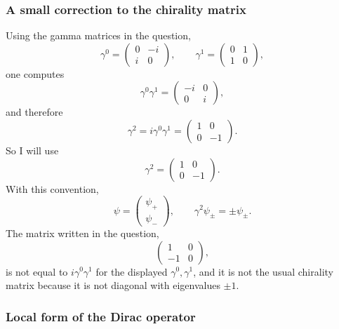 \documentclass[
  10pt,
  a4paper,
  openany]{book}
\begin{document}
\subsubsection{A small correction to the chirality
matrix}\label{a-small-correction-to-the-chirality-matrix}

Using the gamma matrices in the question, \[
\gamma^0=
\begin{pmatrix}
0 & -i\\
i & 0
\end{pmatrix},
\qquad
\gamma^1=
\begin{pmatrix}
0 & 1\\
1 & 0
\end{pmatrix},
\] one computes \[
\gamma^0\gamma^1
=
\begin{pmatrix}
-i & 0\\
0 & i
\end{pmatrix},
\] and therefore \[
\gamma^2=i\gamma^0\gamma^1
=
\begin{pmatrix}
1 & 0\\
0 & -1
\end{pmatrix}.
\] So I will use \[
\gamma^2=
\begin{pmatrix}
1 & 0\\
0 & -1
\end{pmatrix}.
\] With this convention, \[
\psi=
\begin{pmatrix}
\psi_+\\
\psi_-
\end{pmatrix},
\qquad
\gamma^2\psi_\pm=\pm\psi_\pm.
\] The matrix written in the question, \[
\begin{pmatrix}
1 & 0\\
-1 & 0
\end{pmatrix},
\] is not equal to \(i\gamma^0\gamma^1\) for the displayed
\(\gamma^0,\gamma^1\), and it is not the usual chirality matrix because
it is not diagonal with eigenvalues \(\pm 1\).

\subsubsection{Local form of the Dirac
operator}\label{local-form-of-the-dirac-operator}
\end{document}

